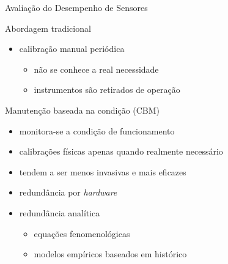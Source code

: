 \documentclass{beamer}
\begin{document}
\begin{frame}{Avaliação do Desempenho de Sensores}
    \begin{block}{Abordagem tradicional}
        \begin{itemize}
            \item calibração manual periódica
                \begin{itemize}
                    \item não se conhece a real necessidade
                    \item instrumentos são retirados de operação
                \end{itemize}
        \end{itemize}
    \end{block}

    \begin{block}{Manutenção baseada na condição (CBM)}
        \begin{itemize}
            \item monitora-se a \alert{condição} de funcionamento
            \item calibrações físicas apenas quando realmente \alert{necessário}
            \item tendem a ser menos invasivas e mais eficazes
                \vspace{6pt}
            \item redundância por \textit{hardware}
            \item redundância \alert{analítica}
                \begin{itemize}
                    \item equações fenomenológicas
                    \item modelos empíricos baseados em \alert{histórico}
                \end{itemize}
        \end{itemize}
        
    \end{block}

\end{frame}
\end{document}
